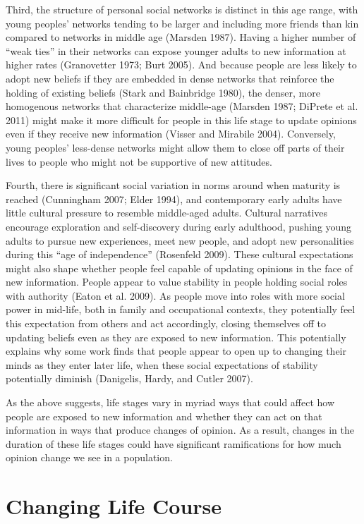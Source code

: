 \documentclass[
  12pt,
]{article}
\begin{document}
Third, the structure of personal social networks is distinct in this age range, with young peoples' networks tending to be larger and including more friends than kin compared to networks in middle age (Marsden 1987). Having a higher number of ``weak ties'' in their networks can expose younger adults to new information at higher rates (Granovetter 1973; Burt 2005). And because people are less likely to adopt new beliefs if they are embedded in dense networks that reinforce the holding of existing beliefs (Stark and Bainbridge 1980), the denser, more homogenous networks that characterize middle-age (Marsden 1987; DiPrete et al. 2011) might make it more difficult for people in this life stage to update opinions even if they receive new information (Visser and Mirabile 2004). Conversely, young peoples' less-dense networks might allow them to close off parts of their lives to people who might not be supportive of new attitudes.

Fourth, there is significant social variation in norms around when maturity is reached (Cunningham 2007; Elder 1994), and contemporary early adults have little cultural pressure to resemble middle-aged adults. Cultural narratives encourage exploration and self-discovery during early adulthood, pushing young adults to pursue new experiences, meet new people, and adopt new personalities during this ``age of independence'' (Rosenfeld 2009). These cultural expectations might also shape whether people feel capable of updating opinions in the face of new information. People appear to value stability in people holding social roles with authority (Eaton et al. 2009). As people move into roles with more social power in mid-life, both in family and occupational contexts, they potentially feel this expectation from others and act accordingly, closing themselves off to updating beliefs even as they are exposed to new information. This potentially explains why some work finds that people appear to open up to changing their minds as they enter later life, when these social expectations of stability potentially diminish (Danigelis, Hardy, and Cutler 2007).

As the above suggests, life stages vary in myriad ways that could affect how people are exposed to new information and whether they can act on that information in ways that produce changes of opinion. As a result, changes in the duration of these life stages could have significant ramifications for how much opinion change we see in a population.

\hypertarget{changing-life-course}{%
\section{Changing Life Course}\label{changing-life-course}}
\end{document}
